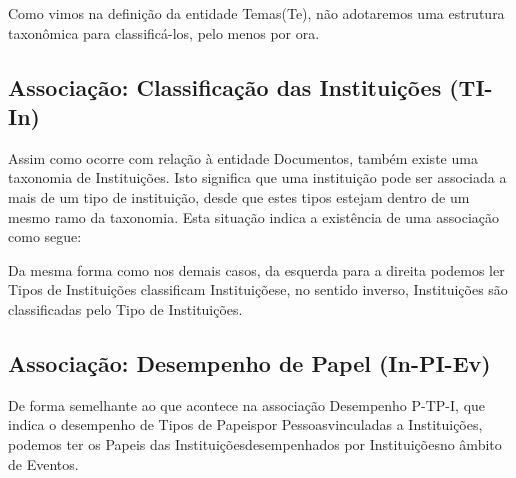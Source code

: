 \documentclass[
12pt,		%
openright,	%
twoside,  %
a4paper,			%
chapter=TITLE,		%
english,			%
french,				%
spanish,			%
brazil				%
]{USPSC-classe/USPSC}
\begin{document}
Como vimos na defini\c{c}\~ao da entidade \textquotedbl Temas\textquotedbl  (Te), n\~ao adotaremos uma estrutura taxon\^omica para classific\'a-los, pelo menos por ora.




\subsection[Associa\c{c}\~ao: Classifica\c{c}\~ao das Institui\c{c}\~oes (TI-In)]{Associa\c{c}\~ao: Classifica\c{c}\~ao das Institui\c{c}\~oes (TI-In)}\label{Associa\c{c}\~ao: Classifica\c{c}\~ao das Institui\c{c}\~oes (TI-In)}
Assim como ocorre com rela\c{c}\~ao \`a entidade \textquotedbl Documentos\textquotedbl , tamb\'em existe uma taxonomia de \textquotedbl Institui\c{c}\~oes\textquotedbl . Isto significa que uma institui\c{c}\~ao pode ser associada a mais de um tipo de institui\c{c}\~ao, desde que estes tipos estejam dentro de um mesmo ramo da taxonomia. Esta situa\c{c}\~ao indica a exist\^encia de uma associa\c{c}\~ao como segue:






Da mesma forma como nos demais casos, da esquerda para a direita podemos ler \textquotedbl Tipos de Institui\c{c}\~oes classificam Institui\c{c}\~oes\textquotedbl  e, no sentido inverso, \textquotedbl Institui\c{c}\~oes s\~ao classificadas pelo Tipo de Institui\c{c}\~oes\textquotedbl .




\subsection[Associa\c{c}\~ao: Desempenho de Papel (In-PI-Ev)]{Associa\c{c}\~ao: Desempenho de Papel (In-PI-Ev)}\label{Associa\c{c}\~ao: Desempenho de Papel (In-PI-Ev)}
De forma semelhante ao que acontece na associa\c{c}\~ao \textquotedbl Desempenho P-TP-I\textquotedbl , que indica o desempenho de \textquotedbl Tipos de Papeis\textquotedbl  por \textquotedbl Pessoas\textquotedbl  vinculadas a \textquotedbl Institui\c{c}\~oes\textquotedbl , podemos ter os \textquotedbl Papeis das Institui\c{c}\~oes\textquotedbl  desempenhados por \textquotedbl Institui\c{c}\~oes\textquotedbl  no \^ambito de \textquotedbl Eventos\textquotedbl .
\end{document}
